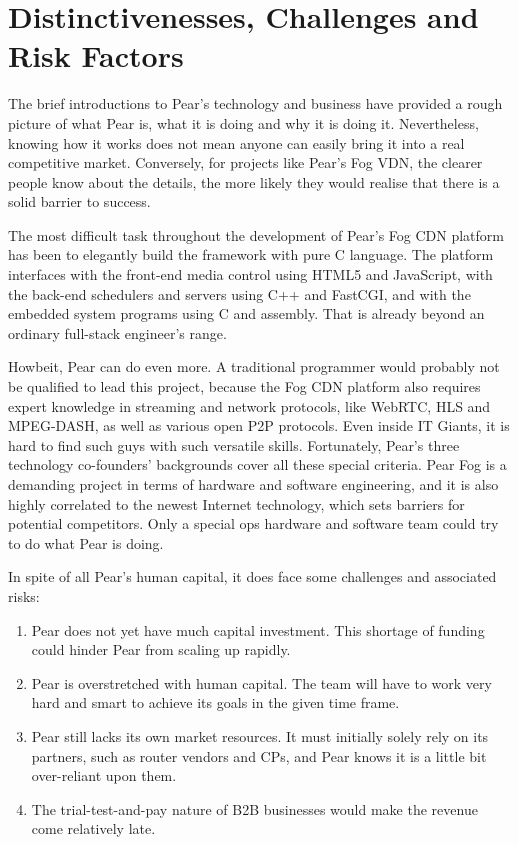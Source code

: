 \section{Distinctivenesses, Challenges and Risk Factors}
The brief introductions to Pear's technology and business have provided a rough picture of what Pear is, what it is doing and why it is doing it. Nevertheless, knowing how it works does not mean anyone can easily bring it into a real competitive market. Conversely, for projects like Pear's Fog VDN, the clearer people know about the details, the more likely they would realise that there is a solid barrier to success. 

The most difficult task throughout the development of Pear's Fog CDN platform has been to elegantly build the framework with pure C language. The platform interfaces with the front-end media control using HTML5 and JavaScript, with the back-end schedulers and servers using C++ and FastCGI, and with the embedded system programs using C and assembly. That is already beyond an ordinary full-stack engineer's range.

Howbeit, Pear can do even more. A traditional programmer would probably not be qualified to lead this project, because the Fog CDN platform also requires expert knowledge in streaming and network protocols, like WebRTC, HLS and MPEG-DASH, as well as various open P2P protocols. Even inside IT Giants, it is hard to find such guys with such versatile skills. Fortunately, Pear's three technology co-founders' backgrounds cover all these special criteria. Pear Fog is a demanding project in terms of hardware and software engineering, and it is also highly correlated to the newest Internet technology, which sets barriers for potential competitors. Only a special ops hardware and software team could try to do what Pear is doing.

In spite of all Pear's human capital, it does face some challenges and associated risks: 
\begin{enumerate}
	\item Pear does not yet have much capital investment. This shortage of funding could hinder Pear from scaling up rapidly. 
	\item Pear is overstretched with human capital. The team will have to work very hard and smart to achieve its goals in the given time frame.
	\item Pear still lacks its own market resources. It must initially solely rely on its partners, such as router vendors and CPs, and Pear knows it is a little bit over-reliant upon them. 
	\item The trial-test-and-pay nature of B2B businesses would make the revenue come relatively late. 
\end{enumerate}

